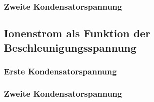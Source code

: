 \subsubsection{Zweite Kondensatorspannung}


\subsection{Ionenstrom als Funktion der Beschleunigungsspannung}

\subsubsection{Erste Kondensatorspannung}

\subsubsection{Zweite Kondensatorspannung}
